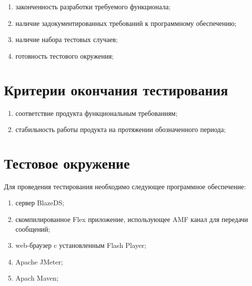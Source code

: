 \begin{enumerate}
\item законченность разработки требуемого функционала;
\item наличие задокументированных требований к программному обеспечению;
\item наличие набора тестовых случаев;
\item готовность тестового окружения;
\end{enumerate}

\section{Критерии окончания тестирования}

\begin{enumerate}
\item соответствие продукта функциональным требованиям;
\item стабильность работы продукта на протяжении обозначенного периода;
\end{enumerate}

\section{Тестовое окружение}

Для проведения тестирования необходимо следующее программное обеспечение:

\begin{enumerate}
\item сервер BlazeDS;
\item скомпилированное Flex приложение, использующее AMF канал для передачи сообщений;
\item web-браузер c установленным Flash Player;
\item Apache JMeter;
\item Apach Maven;
\end{enumerate}
